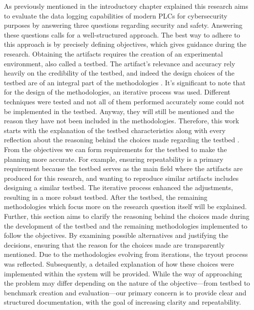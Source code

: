 \documentclass[Master,BMR,english]{twbook}
\begin{document}
As previously mentioned in the introductory chapter explained this research aims to evaluate the data logging capabilities of modern PLCs for cybersecurity purposes by answering three questions regarding security and safety. Answering these questions calls for a well-structured approach. The best way to adhere to this approach is by precisely defining objectives, which gives guidance during the research. Obtaining the artifacts requires the creation of an experimental environment, also called a testbed. The artifact's relevance and accuracy rely heavily on the credibility of the testbed, and indeed the design choices of the testbed are of an integral part of the methodologies \cite{ani_design_2021}. It's significant to note that for the design of the methodologies, an iterative process was used. Different techniques were tested and not all of them performed accurately some could not be implemented in the testbed. Anyway, they will still be mentioned and the reason they have not been included in the methodologies. Therefore, this work starts with the explanation of the testbed characteristics along with every reflection about the reasoning behind the choices made regarding the testbed \cite{pospisil_application_2021}. From the objectives we can form requirements for the testbed to make the planning more accurate. For example, ensuring repeatability is a primary requirement because the testbed serves as the main field where the artifacts are produced for this research, and wanting to reproduce similar artifacts includes designing a similar testbed\cite{ani_design_2021}. The iterative process enhanced the adjustments, resulting in a more robust testbed.  After the testbed, the remaining methodologies which focus more on the research question itself will be explained. Further, this section aims to clarify the reasoning behind the choices made during the development of the testbed and the remaining methodologies implemented to follow the objectives. By examining possible alternatives and justifying the decisions, ensuring that the reason for the choices made are transparently mentioned. Due to the methodologies evolving from iterations, the tryout process was reflected. Subsequently, a detailed explanation of how these choices were implemented within the system will be provided. While the way of approaching the problem may differ depending on the nature of the objective—from testbed to benchmark creation and evaluation—our primary concern is to provide clear and structured documentation, with the goal of increasing clarity and repeatability.
\end{document}
